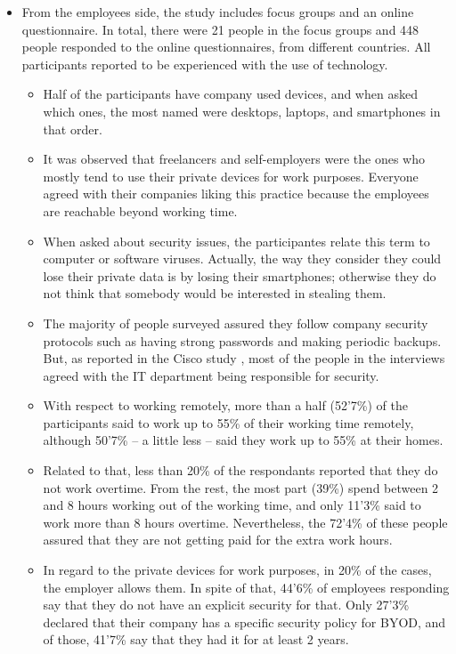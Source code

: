 \begin{itemize}
	\item From the employees side, the study includes focus groups and an online questionnaire. In total, there were 21 people in the focus groups and 448 people responded to the online questionnaires, from different countries. All participants reported to be experienced with the use of technology.
	\begin{itemize}
		\item Half of the participants have company used devices, and when asked which ones, the most named were desktops, laptops, and smartphones in that order.
		\item It was observed that freelancers and self-employers were the ones who mostly tend to use their private devices for work purposes. Everyone agreed with their companies liking this practice because the employees are reachable beyond working time.
		\item When asked about security issues, the participantes relate this term to computer or software viruses. Actually, the way they consider they could lose their private data is by losing their smartphones; otherwise they do not think that somebody would be interested in stealing them.
		\item The majority of people surveyed assured they follow company security protocols such as having strong passwords and making periodic backups. But, as reported in the Cisco study \cite{cisco2012}, most of the people in the interviews agreed with the IT department being responsible for security.
		\item With respect to working remotely, more than a half (52'7\%) of the participants said to work up to 55\% of their working time remotely, although 50'7\% -- a little less -- said they work up to 55\% at their homes.
		\item Related to that, less than 20\% of the respondants reported that they do not work overtime. From the rest, the most part (39\%) spend between 2 and 8 hours working out of the working time, and only 11'3\% said to work more than 8 hours overtime. Nevertheless, the 72'4\% of these people assured that they are not getting paid for the extra work hours.
		\item In regard to the private devices for work purposes, in 20\% of the cases, the employer allows them. In spite of that, 44'6\% of employees responding say that they do not have an explicit security for that. Only 27'3\% declared that their company has a specific security policy for BYOD, and of those, 41'7\% say that they had it for at least 2 years.

\end{itemize}
\end{itemize}
